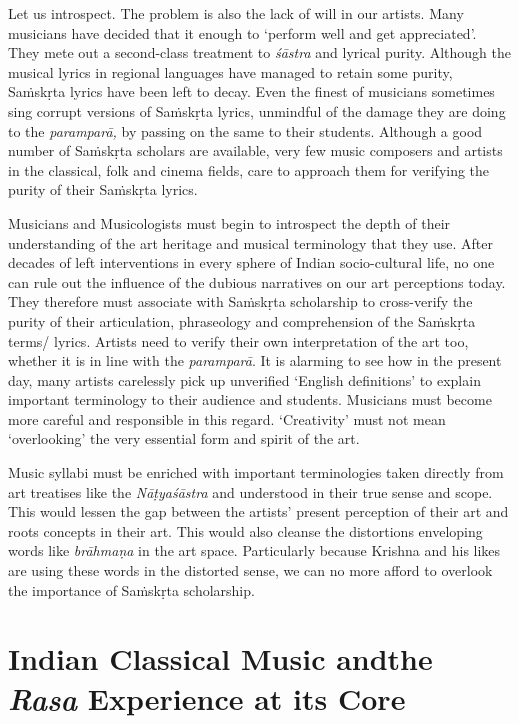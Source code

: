 Let us introspect. The problem is also the lack of will in our artists. Many musicians have decided that it enough to ‘perform well and get appreciated’. They mete out a second-class treatment to \textit{śāstra} and lyrical purity. Although the musical lyrics in regional languages have managed to retain some purity, Saṁskṛta lyrics have been left to decay. Even the finest of musicians sometimes sing corrupt versions of Saṁskṛta lyrics, unmindful of the damage they are doing to the \textit{paramparā,} by passing on the same to their students. Although a good number of Saṁskṛta scholars are available, very few music composers and artists in the classical, folk and cinema fields, care to approach them for verifying the purity of their Saṁskṛta lyrics.

Musicians and Musicologists must begin to introspect the depth of their understanding of the art heritage and musical terminology that they use. After decades of left interventions in every sphere of Indian socio-cultural life, no one can rule out the influence of the dubious narratives on our art perceptions today. They therefore must associate with Saṁskṛta scholarship to cross-verify the purity of their articulation, phraseology and comprehension of the Saṁskṛta terms/ lyrics. Artists need to verify their own interpretation of the art too, whether it is in line with the \textit{paramparā}. It is alarming to see how in the present day, many artists carelessly pick up unverified ‘English definitions’ to explain important terminology to their audience and students. Musicians must become more careful and responsible in this regard. ‘Creativity’ must not mean ‘overlooking’ the very essential form and spirit of the art.

Music syllabi must be enriched with important terminologies taken directly from art treatises like the \textit{Nāṭyaśāstra} and understood in their true sense and scope. This would lessen the gap between the artists’ present perception of their art and roots concepts in their art. This would also cleanse the distortions enveloping words like \textit{brāhmaṇa} in the art space. Particularly because Krishna and his likes are using these words in the distorted sense, we can no more afford to overlook the importance of Saṁskṛta scholarship.

\vspace{-.3cm}

\section*{Indian Classical Music and\hfill \break the \textit{Rasa} Experience at its Core}

